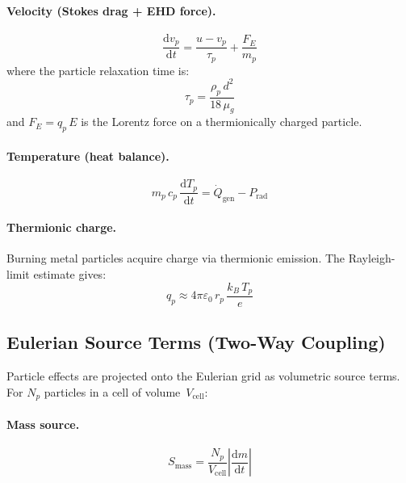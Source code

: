 \documentclass[11pt,a4paper]{article}
\begin{document}
\paragraph{Velocity (Stokes drag + EHD force).}
\begin{equation}\label{eq:dvp_dt}
  \frac{\mathrm{d}v_p}{\mathrm{d}t}
    = \frac{u - v_p}{\tau_p} + \frac{F_E}{m_p}
\end{equation}
where the particle relaxation time is:
\begin{equation}\label{eq:tau_p}
  \tau_p = \frac{\rho_p\,d^2}{18\,\mu_g}
\end{equation}
and $F_E = q_p\,E$ is the Lorentz force on a thermionically charged
particle.

\paragraph{Temperature (heat balance).}
\begin{equation}\label{eq:dTp_dt}
  m_p\,c_p\,\frac{\mathrm{d}T_p}{\mathrm{d}t}
    = \dot{Q}_{\mathrm{gen}} - P_{\mathrm{rad}}
\end{equation}

\paragraph{Thermionic charge.}
Burning metal particles acquire charge via thermionic emission.
The Rayleigh-limit estimate gives:
\begin{equation}\label{eq:q_p}
  q_p \approx 4\pi\varepsilon_0\,r_p\,\frac{k_B\,T_p}{e}
\end{equation}

\subsection{Eulerian Source Terms (Two-Way Coupling)}

Particle effects are projected onto the Eulerian grid as volumetric
source terms.  For $N_p$ particles in a cell of volume~$V_{\mathrm{cell}}$:

\paragraph{Mass source.}
\begin{equation}\label{eq:S_mass}
  S_{\mathrm{mass}} = \frac{N_p}{V_{\mathrm{cell}}}
    \left|\frac{\mathrm{d}m}{\mathrm{d}t}\right|
\end{equation}
\end{document}
